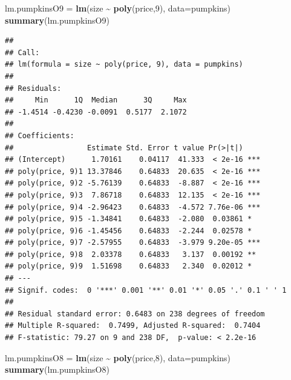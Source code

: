 \documentclass[
]{book}
\newenvironment{Shaded}{\begin{snugshade}}{\end{snugshade}}
\newcommand{\AttributeTok}[1]{\textcolor[rgb]{0.13,0.29,0.53}{#1}}
\newcommand{\DecValTok}[1]{\textcolor[rgb]{0.00,0.00,0.81}{#1}}
\newcommand{\FunctionTok}[1]{\textcolor[rgb]{0.13,0.29,0.53}{\textbf{#1}}}
\newcommand{\NormalTok}[1]{#1}
\newcommand{\OtherTok}[1]{\textcolor[rgb]{0.56,0.35,0.01}{#1}}
\newcommand{\SpecialCharTok}[1]{\textcolor[rgb]{0.81,0.36,0.00}{\textbf{#1}}}
\begin{document}
\begin{Shaded}
\begin{Highlighting}[]
\NormalTok{lm.pumpkinsO9 }\OtherTok{=}  \FunctionTok{lm}\NormalTok{(size }\SpecialCharTok{\textasciitilde{}} \FunctionTok{poly}\NormalTok{(price,}\DecValTok{9}\NormalTok{), }\AttributeTok{data=}\NormalTok{pumpkins)}
\FunctionTok{summary}\NormalTok{(lm.pumpkinsO9)}
\end{Highlighting}
\end{Shaded}

\begin{verbatim}
## 
## Call:
## lm(formula = size ~ poly(price, 9), data = pumpkins)
## 
## Residuals:
##     Min      1Q  Median      3Q     Max 
## -1.4514 -0.4230 -0.0091  0.5177  2.1072 
## 
## Coefficients:
##                 Estimate Std. Error t value Pr(>|t|)    
## (Intercept)      1.70161    0.04117  41.333  < 2e-16 ***
## poly(price, 9)1 13.37846    0.64833  20.635  < 2e-16 ***
## poly(price, 9)2 -5.76139    0.64833  -8.887  < 2e-16 ***
## poly(price, 9)3  7.86718    0.64833  12.135  < 2e-16 ***
## poly(price, 9)4 -2.96423    0.64833  -4.572 7.76e-06 ***
## poly(price, 9)5 -1.34841    0.64833  -2.080  0.03861 *  
## poly(price, 9)6 -1.45456    0.64833  -2.244  0.02578 *  
## poly(price, 9)7 -2.57955    0.64833  -3.979 9.20e-05 ***
## poly(price, 9)8  2.03378    0.64833   3.137  0.00192 ** 
## poly(price, 9)9  1.51698    0.64833   2.340  0.02012 *  
## ---
## Signif. codes:  0 '***' 0.001 '**' 0.01 '*' 0.05 '.' 0.1 ' ' 1
## 
## Residual standard error: 0.6483 on 238 degrees of freedom
## Multiple R-squared:  0.7499, Adjusted R-squared:  0.7404 
## F-statistic: 79.27 on 9 and 238 DF,  p-value: < 2.2e-16
\end{verbatim}

\begin{Shaded}
\begin{Highlighting}[]
\NormalTok{lm.pumpkinsO8 }\OtherTok{=}  \FunctionTok{lm}\NormalTok{(size }\SpecialCharTok{\textasciitilde{}} \FunctionTok{poly}\NormalTok{(price,}\DecValTok{8}\NormalTok{), }\AttributeTok{data=}\NormalTok{pumpkins)}
\FunctionTok{summary}\NormalTok{(lm.pumpkinsO8)}
\end{Highlighting}
\end{Shaded}
\end{document}
